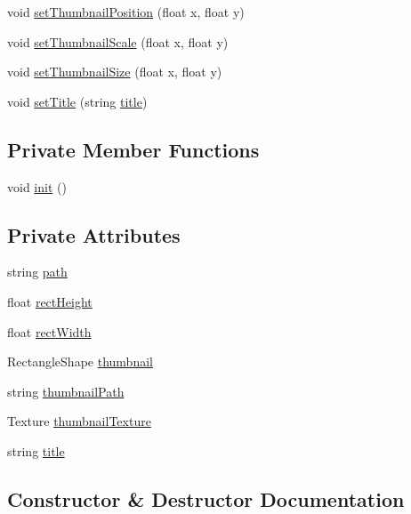 \begin{DoxyCompactItemize}
\item 
void \hyperlink{classFile_a03d9ec0e23729ce2f4eeb9ea517705ce}{set\+Thumbnail\+Position} (float x, float y)
\item 
void \hyperlink{classFile_a480ccac018305567d91d6060f1079715}{set\+Thumbnail\+Scale} (float x, float y)
\item 
void \hyperlink{classFile_a8540877c99c3e81100d92485c5253c8f}{set\+Thumbnail\+Size} (float x, float y)
\item 
void \hyperlink{classFile_a185b799b99d7ecc46e6de8e8d858cc45}{set\+Title} (string \hyperlink{classFile_a302a98ac2a5820e288e9be26d5947bc4}{title})
\end{DoxyCompactItemize}
\subsection*{Private Member Functions}
\begin{DoxyCompactItemize}
\item 
void \hyperlink{classFile_ad129ed26c172a29873b1956c1ea69c32}{init} ()
\end{DoxyCompactItemize}
\subsection*{Private Attributes}
\begin{DoxyCompactItemize}
\item 
string \hyperlink{classFile_afd963fd6ba55fa762f7d3ab962e97e6c}{path}
\item 
float \hyperlink{classFile_a799be77c68202e624f9007a64cd728a3}{rect\+Height}
\item 
float \hyperlink{classFile_ac7908347d94014323e180ebbf6e23281}{rect\+Width}
\item 
Rectangle\+Shape \hyperlink{classFile_ac2c44ef77d792ce526677f3d891aaf80}{thumbnail}
\item 
string \hyperlink{classFile_a66dfca1082630f791541c8feefbc729d}{thumbnail\+Path}
\item 
Texture \hyperlink{classFile_a569136d0908ee11b7afcf59769db5e0c}{thumbnail\+Texture}
\item 
string \hyperlink{classFile_a302a98ac2a5820e288e9be26d5947bc4}{title}
\end{DoxyCompactItemize}


\subsection{Constructor \& Destructor Documentation}
